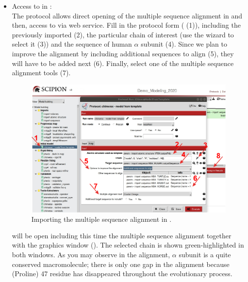 \begin{itemize}
 \item Access to \modeller in \chimera:\\
 The protocol  allows direct opening of the multiple sequence alignment in \chimera and then, access to \modeller via web service. Fill in the protocol form ( (1)), including the   previously imported (2), the particular chain of interest (use the wizard to select it (3)) and the  sequence of human  $\alpha$ subunit (4). Since we plan to improve the alignment by including additional sequences to align (5), they will have to be added next (6). Finally, select one of the multiple sequence alignment tools (7). 
 
 \begin{figure}[H]
  \centering 
  \captionsetup{width=.9\linewidth} 
  \includegraphics[width=1\textwidth]{Images/Fig13}
  \caption{Importing the multiple sequence alignment in \chimera.}
  \label{fig:model_from_template_protocol}
  \end{figure}
 
 \chimera will be open including this time the multiple sequence alignment together with the \chimera graphics window (). The  selected chain is shown green-highlighted in both windows. As you may observe in the alignment,  $\alpha$ subunit is a quite conserved macromolecule; there is only one gap in the alignment because  (Proline) 47 residue has disappeared throughout the evolutionary process. 
 

\end{itemize}
